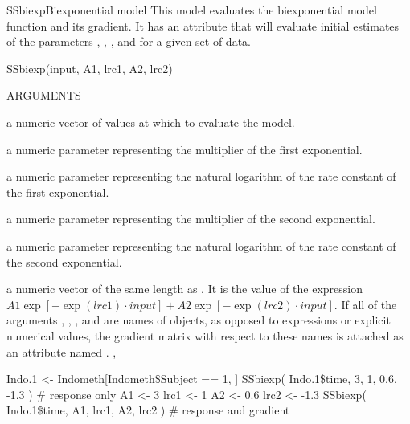 \documentclass[pdftex]{article} \usepackage{url,graphicx}
\begin{document}
\begin{Helpfile}{SSbiexp}{Biexponential model}
This  model evaluates the biexponential model function
and its gradient.  It has an  attribute that 
will evaluate initial estimates of the parameters , ,
, and  for a given set of data.
\begin{Example}
SSbiexp(input, A1, lrc1, A2, lrc2)
\end{Example}
\begin{Argument}{ARGUMENTS}
\item[\Co{input:}]
a numeric vector of values at which to evaluate the model.
\item[\Co{A1:}]
a numeric parameter representing the multiplier of the first
exponential.
\item[\Co{lrc1:}]
a numeric parameter representing the natural logarithm of
the rate constant of the first exponential.
\item[\Co{A2:}]
a numeric parameter representing the multiplier of the second
exponential.
\item[\Co{lrc2:}]
a numeric parameter representing the natural logarithm of
the rate constant of the second exponential.
\end{Argument}
a numeric vector of the same length as .  It is the value of
the expression
$A1\exp[-\exp(lrc1) \cdot input]+A2\exp[-\exp(lrc2) \cdot input]$.
If all of the arguments , , , and
 are names of objects, as opposed to expressions or
explicit numerical values, the gradient matrix with respect to these
names is attached as an attribute named .
, 
\need 15pt
\vspace{-16pt} 
\begin{Example}
Indo.1 <- Indometh[Indometh\$Subject == 1, ]
SSbiexp( Indo.1\$time, 3, 1, 0.6, -1.3 )  # response only
A1 <- 3
lrc1 <- 1
A2 <- 0.6
lrc2 <- -1.3
SSbiexp( Indo.1\$time, A1, lrc1, A2, lrc2 ) # response and gradient
\end{Example}
\end{Helpfile}
\end{document}
